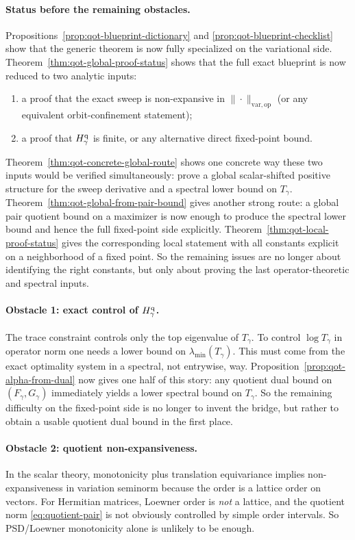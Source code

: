 \documentclass[11pt]{article}
\newcommand{\op}{\mathrm{op}}
\newcommand{\varop}{\mathrm{var},\op}
\theoremstyle{plain}
\begin{document}
\paragraph{Status before the remaining obstacles.}
Propositions~\ref{prop:qot-blueprint-dictionary} and \ref{prop:qot-blueprint-checklist} show that the generic theorem is now fully specialized on the variational side.
Theorem~\ref{thm:qot-global-proof-status} shows that the full exact blueprint is now reduced to two analytic inputs:
\begin{enumerate}[label=\textnormal{(\alph*)}]
\item a proof that the exact sweep is non-expansive in $\|\cdot\|_{\varop}$ (or any equivalent orbit-confinement statement);
\item a proof that $H_\gamma^{\rm q}$ is finite, or any alternative direct fixed-point bound.
\end{enumerate}
Theorem~\ref{thm:qot-concrete-global-route} shows one concrete way these two inputs would be verified simultaneously: prove a global scalar-shifted positive structure for the sweep derivative and a spectral lower bound on $T_\gamma$.
Theorem~\ref{thm:qot-global-from-pair-bound} gives another strong route: a global pair quotient bound on a maximizer is now enough to produce the spectral lower bound and hence the full fixed-point side explicitly.
Theorem~\ref{thm:qot-local-proof-status} gives the corresponding local statement with all constants explicit on a neighborhood of a fixed point.
So the remaining issues are no longer about identifying the right constants, but only about proving the last operator-theoretic and spectral inputs.

\paragraph{Obstacle 1: exact control of $H_\gamma^{\rm q}$.}
The trace constraint controls only the top eigenvalue of $T_\gamma$.
To control $\log T_\gamma$ in operator norm one needs a lower bound on $\lambda_{\min}(T_\gamma)$.
This must come from the exact optimality system in a spectral, not entrywise, way.
Proposition~\ref{prop:qot-alpha-from-dual} now gives one half of this story: any quotient dual bound on $(F_\gamma,G_\gamma)$ immediately yields a lower spectral bound on $T_\gamma$.
So the remaining difficulty on the fixed-point side is no longer to invent the bridge, but rather to obtain a usable quotient dual bound in the first place.

\paragraph{Obstacle 2: quotient non-expansiveness.}
In the scalar theory, monotonicity plus translation equivariance implies non-expansiveness in variation seminorm because the order is a lattice order on vectors.
For Hermitian matrices, Loewner order is \emph{not} a lattice, and the quotient norm \eqref{eq:quotient-pair} is not obviously controlled by simple order intervals.
So PSD/Loewner monotonicity alone is unlikely to be enough.
\end{document}
